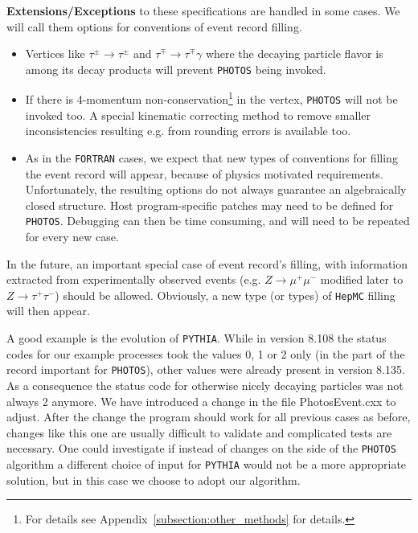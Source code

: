 \documentclass[]{Photos_interface_design}
\begin{document}
\noindent
\textbf{ Extensions/Exceptions} to these specifications are handled in some cases. We will call them
options for conventions of event record filling.
  \begin{itemize} 
    \item  Vertices like $\tau^\pm \rightarrow \tau^\pm$ and $\tau^\mp \rightarrow \tau^\mp \gamma$ 
           where the decaying particle flavor is among its decay products will prevent  {\tt PHOTOS} being invoked.

    \item  If there is  4-momentum non-conservation\footnote{For details see 
           Appendix~\ref{subsection:other_methods} for details.} in the vertex,
           {\tt PHOTOS} will not be invoked too.  A special kinematic correcting
           method to remove smaller inconsistencies resulting e.g. from rounding errors is available too.

    \item
           As in the {\tt FORTRAN} cases, we expect that  new  types of 
           conventions for filling the event record
           will appear, because of physics motivated requirements.
           Unfortunately, the resulting options do not always guarantee
           an algebraically closed structure.  
           Host program-specific patches may need to be defined for
           {\tt PHOTOS}. 
           Debugging can then be time consuming, and will need to be repeated for every new
           case.
   \end{itemize}


 In the future,  an important special case of event record's filling, with
information extracted from experimentally observed events (e.g. $Z\to \mu^+\mu^-$
 modified later to $Z\to \tau^+\tau^-$) should be allowed.
  Obviously, a new type (or types) of {\tt HepMC} filling will then appear.

A good example is the evolution of {\tt PYTHIA}. While in version 8.108 the status codes for 
our example processes took the values 0, 1 or 2  only (in the part of the record 
important for {\tt PHOTOS}), other values were already present in
version 8.135. As a consequence the status code for 
otherwise nicely decaying particles was not always 2 anymore. We have introduced 
a change  in the file PhotosEvent.cxx to adjust. After  the change
the program should work for all previous cases as before, 
changes like this one are usually difficult to validate
and complicated  tests are necessary. One could  investigate 
if instead of changes on the side of the {\tt PHOTOS} algorithm a different choice of  input for {\tt PYTHIA} would not 
be a more appropriate 
solution, but in this case we choose to adopt our algorithm.
\end{document}
